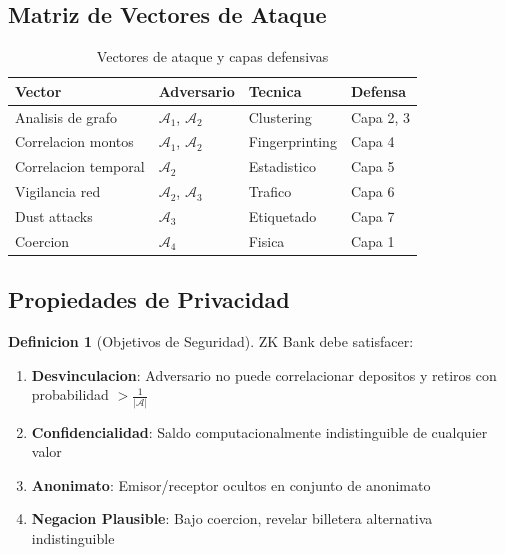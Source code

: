 \documentclass[11pt]{article}
\theoremstyle{definition}
\newtheorem{definicion}{Definicion}[section]
\theoremstyle{plain}
\theoremstyle{remark}
\begin{document}
\subsection{Matriz de Vectores de Ataque}

\begin{table}[H]
\centering
\caption{Vectores de ataque y capas defensivas}
\label{tab:vectors}
\begin{tabular}{llll}
\toprule
\textbf{Vector} & \textbf{Adversario} & \textbf{Tecnica} & \textbf{Defensa} \\
\midrule
Analisis de grafo & $\mathcal{A}_1$, $\mathcal{A}_2$ & Clustering~\cite{meiklejohn2013fistful} & Capa 2, 3 \\
Correlacion montos & $\mathcal{A}_1$, $\mathcal{A}_2$ & Fingerprinting & Capa 4 \\
Correlacion temporal & $\mathcal{A}_2$ & Estadistico~\cite{moser2013anonymity} & Capa 5 \\
Vigilancia red & $\mathcal{A}_2$, $\mathcal{A}_3$ & Trafico~\cite{biryukov2014deanonymisation} & Capa 6 \\
Dust attacks & $\mathcal{A}_3$ & Etiquetado & Capa 7 \\
Coercion & $\mathcal{A}_4$ & Fisica & Capa 1 \\
\bottomrule
\end{tabular}
\end{table}

\subsection{Propiedades de Privacidad}

\begin{definicion}[Objetivos de Seguridad]
ZK Bank debe satisfacer:
\begin{enumerate}
    \item \textbf{Desvinculacion}: Adversario no puede correlacionar depositos y retiros con probabilidad $> \frac{1}{|\mathcal{A}|}$
    \item \textbf{Confidencialidad}: Saldo computacionalmente indistinguible de cualquier valor
    \item \textbf{Anonimato}: Emisor/receptor ocultos en conjunto de anonimato
    \item \textbf{Negacion Plausible}: Bajo coercion, revelar billetera alternativa indistinguible
\end{enumerate}
\end{definicion}
\end{document}
